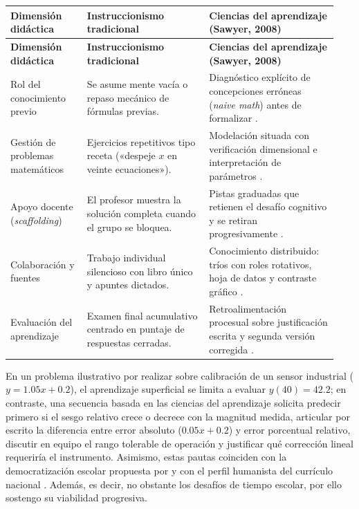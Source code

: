 \documentclass[spanish,letterpaper,oneside]{article}
\begin{document}
{\small{}\renewcommand{\arraystretch}{1.32}
\begin{longtable}{|>{\raggedright\arraybackslash}p{0.22\linewidth}|>{\raggedright\arraybackslash}p{0.35\linewidth}|>{\raggedright\arraybackslash}p{0.37\linewidth}|}\hline
\rowcolor{iiiepePale} \textbf{Dimensión didáctica} & \textbf{Instruccionismo tradicional} & \textbf{Ciencias del aprendizaje (Sawyer, 2008)} \\\hline
\endfirsthead
\hline
\rowcolor{iiiepePale} \textbf{Dimensión didáctica} & \textbf{Instruccionismo tradicional} & \textbf{Ciencias del aprendizaje (Sawyer, 2008)} \\\hline
\endhead
Rol del conocimiento previo & Se asume mente vacía o repaso mecánico de fórmulas previas. & Diagnóstico explícito de concepciones erróneas (\textit{naive math}) antes de formalizar \citep{sawyer2008optimizing}. \\\hline
Gestión de problemas matemáticos & Ejercicios repetitivos tipo receta («despeje $x$ en veinte ecuaciones»). & Modelación situada con verificación dimensional e interpretación de parámetros \citep{conalep2025mecatronica}. \\\hline
Apoyo docente (\textit{scaffolding}) & El profesor muestra la solución completa cuando el grupo se bloquea. & Pistas graduadas que retienen el desafío cognitivo y se retiran progresivamente \citep{eef2017mathematics}. \\\hline
Colaboración y fuentes & Trabajo individual silencioso con libro único y apuntes dictados. & Conocimiento distribuido: tríos con roles rotativos, hoja de datos y contraste gráfico \citep{sawyer2008optimizing}. \\\hline
Evaluación del aprendizaje & Examen final acumulativo centrado en puntaje de respuestas cerradas. & Retroalimentación procesual sobre justificación escrita y segunda versión corregida \citep{eef2021feedback}. \\\hline
\end{longtable}}

En un problema ilustrativo por realizar sobre calibración de un sensor industrial ($y = 1.05x + 0.2$), el aprendizaje superficial se limita a evaluar $y(40) = 42.2$; en contraste, una secuencia basada en las ciencias del aprendizaje solicita predecir primero si el sesgo relativo crece o decrece con la magnitud medida, articular por escrito la diferencia entre error absoluto ($0.05x + 0.2$) y error porcentual relativo, discutir en equipo el rango tolerable de operación y justificar qué corrección lineal requeriría el instrumento. Asimismo, estas pautas coinciden con la democratización escolar propuesta por \citet{meirieu2020escuela} y con el perfil humanista del currículo nacional \citep{sep2023pensamiento}. Además, es decir, no obstante los desafíos de tiempo escolar, por ello sostengo su viabilidad progresiva.
\end{document}
